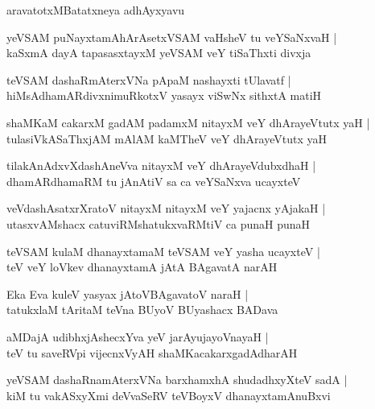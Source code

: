 \documentclass[twoside,12pt,openright]{book}
\newcounter{shloka}[chapter]
\begin{document}
\begin{center}
aravatotxMBatatxneya adhAyxyavu
\end{center}

\begin{shloka}%
yeVSAM puNayxtamAhArAsetxVSAM vaHsheV tu veYSaNxvaH |\\
kaSxmA dayA tapasasxtayxM yeVSAM veY tiSaThxti divxja 
\end{shloka}

\begin{shloka}%
teVSAM dashaRmAterxVNa pApaM nashayxti tUlavatf  |\\
hiMsAdhamARdivxnimuRkotxV yasayx viSwNx sithxtA matiH
\end{shloka}

\begin{shloka}%
shaMKaM cakarxM gadAM padamxM nitayxM veY dhArayeVtutx yaH |\\
tulasiVkASaThxjAM mAlAM kaMTheV veY dhArayeVtutx yaH 
\end{shloka}

\begin{shloka}%
tilakAnAdxvXdashAneVva nitayxM veY dhArayeVdubxdhaH |\\
dhamARdhamaRM tu jAnAtiV sa ca veYSaNxva ucayxteV 
\end{shloka}

\begin{shloka}%
veVdashAsatxrXratoV nitayxM nitayxM veY yajacnx yAjakaH |\\
utasxvAMshacx catuviRMshatukxvaRMtiV ca punaH punaH 
\end{shloka}

\begin{shloka}%
teVSAM kulaM dhanayxtamaM teVSAM veY yasha ucayxteV |\\
teV veY loVkev dhanayxtamA jAtA BAgavatA narAH 
\end{shloka}

\begin{shloka}%
Eka Eva kuleV yasyax jAtoVBAgavatoV naraH |\\
tatukxlaM tAritaM teVna BUyoV BUyashacx BADava 
\end{shloka}

\begin{shloka}%
aMDajA udibhxjAshecxYva yeV jarAyujayoVnayaH |\\
teV tu saveRVpi vijecnxVyAH shaMKacakarxgadAdharAH
\end{shloka}

\begin{shloka}%
yeVSAM dashaRnamAterxVNa barxhamxhA shudadhxyXteV sadA |\\
kiM tu vakASxyXmi deVvaSeRV teVBoyxV dhanayxtamAnuBxvi
\end{shloka}
\end{document}
